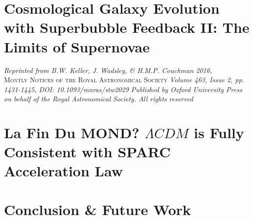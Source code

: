 \documentclass[letterpaper,12pt,twoside,openright]{report} %
\begin{document}
\chapter{Cosmological Galaxy Evolution with Superbubble Feedback II: The Limits
of Supernovae}
\thispagestyle{fancy}
\textit{Reprinted from B.W. Keller, J. Wadsley, \& H.M.P.
Couchman 2016,} \\ \textsc{Montly Notices of the Royal Astronomical Society}
\textit{Volume 463, Issue 2, pp. 1431-1445, DOI: 10.1093/mnras/stw2029
Published by Oxford University Press on behalf of the Royal Astronomical
Society.  All rights reserved}

\chapter{La Fin Du MOND? $\Lambda CDM$ is Fully Consistent with SPARC
Acceleration Law}
\thispagestyle{fancy}

\chapter{Conclusion \& Future Work}
\thispagestyle{fancy}

\end{document}
